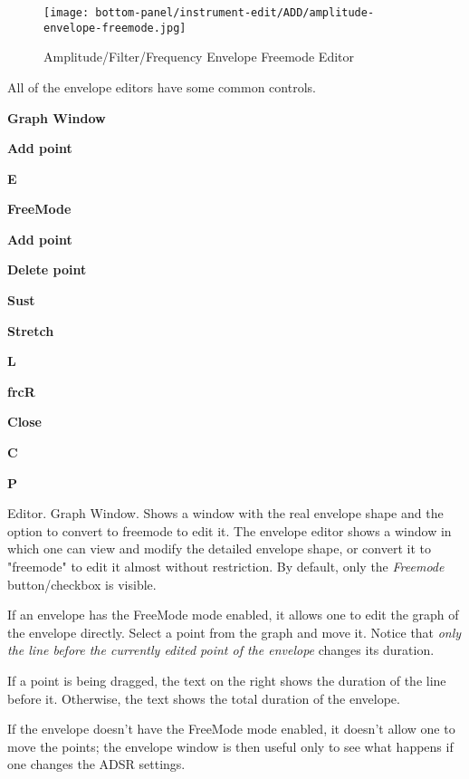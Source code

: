 \begin{figure}[H]
   \centering 
   \texttt{[image: bottom-panel/instrument-edit/ADD/amplitude-envelope-freemode.jpg]}
   \caption{Amplitude/Filter/Frequency Envelope Freemode Editor}
   \label{fig:amplitude_envelope_freemode}
\end{figure}

   All of the envelope editors have some common controls.

   \begin{enumber}
      \item \textbf{Graph Window}
      \item \textbf{Add point}
      \item \textbf{E}
      \item \textbf{FreeMode}
      \item \textbf{Add point}
      \item \textbf{Delete point}
      \item \textbf{Sust}
      \item \textbf{Stretch}
      \item \textbf{L}
      \item \textbf{frcR}
      \item \textbf{Close}
      \item \textbf{C}
      \item \textbf{P}
   \end{enumber}

   \setcounter{ItemCounter}{0}      %

   Editor.  Graph Window.
   Shows a window with the real envelope shape and the option to convert to
   freemode to edit it.
   The envelope editor shows a window in which one can view and modify the
   detailed envelope shape, or convert it to "freemode" to edit it almost
   without restriction.
   By default, only the \textsl{Freemode} button/checkbox is visible.

   If an envelope has the FreeMode mode enabled, it allows one to edit the
   graph of the envelope directly. Select a point from the graph and move it.
   Notice that \textsl{only the line before the currently edited point of the
   envelope} changes its duration.

   If a point is being dragged, the text on the right shows the duration of
   the line before it. Otherwise, the text shows the total duration of the
   envelope. 

   If the envelope doesn't have the FreeMode mode enabled, it doesn't allow
   one to move the points; the envelope window is then useful only to see
   what happens if one changes the ADSR settings.

